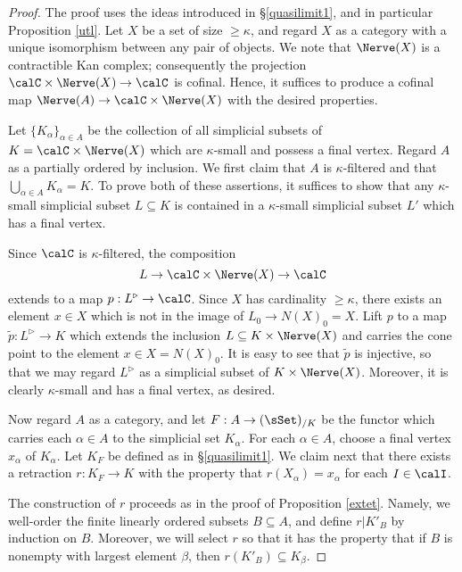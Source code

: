 \begin{proof}
The proof uses the ideas introduced in \S \ref{quasilimit1}, and in particular Proposition \ref{utl}.
Let $X$ be a set of size $\geq \kappa$, and regard $X$ as a
category with a unique isomorphism between any pair of objects. We
note that $\Nerve(X)$ is a contractible Kan complex; consequently the
projection $\calC \times \Nerve(X) \rightarrow \calC$ is cofinal. Hence, it
suffices to produce a cofinal map $\Nerve(A) \rightarrow \calC \times \Nerve(X)$
with the desired properties.

Let $\{ K_{\alpha} \}_{\alpha \in A}$ be the collection of all
simplicial subsets of $K = \calC \times \Nerve(X)$ which are $\kappa$-small and
possess a final vertex. Regard $A$ as a partially ordered by inclusion.
We first claim that $A$ is $\kappa$-filtered and that
$\bigcup_{\alpha \in A} K_{\alpha} = K$. To prove both
of these assertions, it suffices to show that any $\kappa$-small
simplicial subset $L \subseteq K$ is contained in a
$\kappa$-small simplicial subset $L'$ which has a final
vertex.

Since $\calC$ is $\kappa$-filtered, the composition
$$L \rightarrow \calC
\times \Nerve(X) \rightarrow \calC$$ extends to a map $p: L^{\triangleright} \rightarrow \calC$.
Since $X$ has cardinality $\geq \kappa$, there exists an element
$x \in X$ which is not in the image of $L_0 \rightarrow N(X)_0 = X$.
Lift $p$ to a map $\widetilde{p}: L^{\triangleright} \rightarrow K$ which extends the inclusion $L \subseteq K \times
\Nerve(X)$ and carries the cone point to the element $x \in X = N(X)_0$. It
is easy to see that $\widetilde{p}$ is injective, so that we may
regard $L^{\triangleright}$ as a simplicial subset of $K \times
\Nerve(X)$. Moreover, it is clearly $\kappa$-small and has a
final vertex, as desired.

Now regard $A$ as a category, and let $F: A \rightarrow (\sSet)_{/K}$ be the functor
which carries each $\alpha \in A$ to the simplicial set $K_{\alpha}$. For each
$\alpha \in A$, choose a final vertex $x_\alpha$ of $K_{\alpha}$.
Let $K_F$ be defined as in \S \ref{quasilimit1}. We claim next that there 
exists a retraction $r: K_F \rightarrow K$ with
the property that $r(X_{\alpha}) = x_{\alpha}$ for each $I \in \calI$.

The construction of $r$ proceeds as in the proof of Proposition
\ref{extet}. Namely, we well-order the finite linearly ordered subsets $B
\subseteq A$, and define $r|K'_B$ by induction on $B$.
Moreover, we will select $r$ so that it has the property that if
$B$ is nonempty with largest element $\beta$, then $r(K'_B)
\subseteq K_{\beta}$.


\end{proof}

